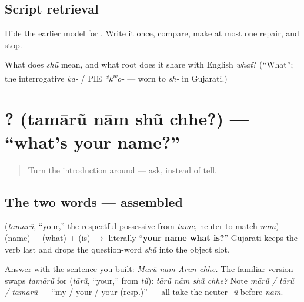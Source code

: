 \subsection*{Script retrieval}
Hide the earlier model for \textbf{}. Write it once, compare, make at most one repair, and stop.

\begin{tcolorbox}[breakable,colback=teal!4,colframe=teal!35!black,title={Before you move on}]
What does \emph{shũ} mean, and what root does it share with English \emph{what}? (\textquotedblleft{}What\textquotedblright{}; the interrogative \emph{ka-} / PIE \emph{*k\textsuperscript{w}o-} — worn to \emph{sh-} in Gujarati.)
\end{tcolorbox}
\section[\gu{તમારું} \gu{નામ} \gu{શું} \gu{છે}?]{   ? (tamārũ nām shũ chhe?) — \textquotedblleft{}what's your name?\textquotedblright{}}

\label{lesson:GU-C02-tamarun-naam-shun-chhe}



\begin{quote}
Turn the introduction around — ask, instead of tell.
\end{quote}

\subsection*{The two words — assembled}
\textbf{} (\emph{tamārũ}, \textquotedblleft{}your,\textquotedblright{} the respectful possessive from \emph{tame}, neuter to match \emph{nām}) + \textbf{} (name) + \textbf{} (what) + \textbf{} (is) $\to$ literally \textquotedblleft{}\textbf{your name what is?}\textquotedblright{} Gujarati keeps the verb last and drops the question-word \emph{shũ} into the object slot.

\begin{grammarlens}[title={Grammar Lens: answering, and the familiar form}]
Answer with the sentence you built: \emph{Mārũ nām Arun chhe.} The familiar version swaps \emph{tamārũ} for \textbf{} (\emph{tārũ}, \textquotedblleft{}your,\textquotedblright{} from \emph{tũ}): \emph{tārũ nām shũ chhe?} Note \emph{mārũ / tārũ / tamārũ} — \textquotedblleft{}my / your / your (resp.)\textquotedblright{} — all take the neuter \emph{-ũ} before \emph{nām}.
\end{grammarlens}


